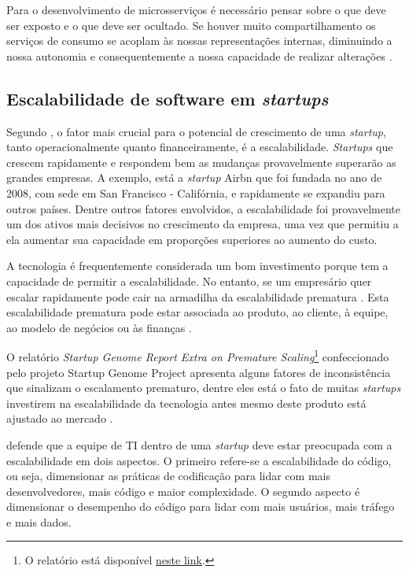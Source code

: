 Para o desenvolvimento de microsserviços é necessário pensar sobre o que deve ser
exposto e o que deve ser ocultado. Se houver muito compartilhamento os serviços de
consumo se acoplam às nossas representações internas, diminuindo a nossa autonomia
e consequentemente a nossa capacidade de realizar alterações \cite{Newman2015}.

\subsection{Escalabilidade de software em \textit{startups}}

Segundo , o fator mais crucial para o potencial
de crescimento de uma \textit{startup}, tanto operacionalmente quanto financeiramente,
é a escalabilidade. \textit{Startups} que crescem rapidamente e respondem bem as
mudanças provavelmente superarão as grandes empresas. A exemplo, está a \textit{startup}
Airbn que foi fundada no ano de 2008, com sede em San Francisco - Califórnia, e
rapidamente se expandiu para outros países. Dentre outros fatores envolvidos, a
escalabilidade foi provavelmente um dos ativos mais decisivos no crescimento da
empresa, uma vez que permitiu a ela aumentar sua capacidade em proporções superiores
ao aumento do custo.

A tecnologia é frequentemente considerada um bom investimento porque tem a capacidade
de permitir a escalabilidade. No entanto, se um empresário quer escalar rapidamente
pode cair na armadilha da escalabilidade prematura \cite{Kotsch2017}. Esta escalabilidade
prematura pode estar associada ao produto, ao cliente, à equipe, ao modelo de negócios
ou às finanças \cite{StartupGenome2011}.

O relatório \textit{Startup Genome Report Extra on Premature Scaling}\footnote{O relatório
está disponível \href{https://a4389177-39da-4622-a867-e7d6f48a3333.filesusr.com/ugd/fde30c_6b9eb284e987474899a746989086d8ee.pdf}
{neste link}.}
confeccionado pelo projeto Startup Genome Project apresenta alguns fatores de inconsistência
que sinalizam o escalamento prematuro, dentre eles está o fato de muitas \textit{startups}
investirem na escalabilidade da tecnologia antes mesmo deste produto está ajustado ao
mercado \cite{StartupGenome2011}.

 defende que a equipe de \gls{TI} dentro de uma \textit{startup}
deve estar preocupada com a escalabilidade em dois aspectos. O primeiro refere-se a
escalabilidade do código, ou seja, dimensionar as práticas de codificação para lidar
com mais desenvolvedores, mais código e maior complexidade. O segundo aspecto é dimensionar
o desempenho do código para lidar com mais usuários, mais tráfego e mais dados.

